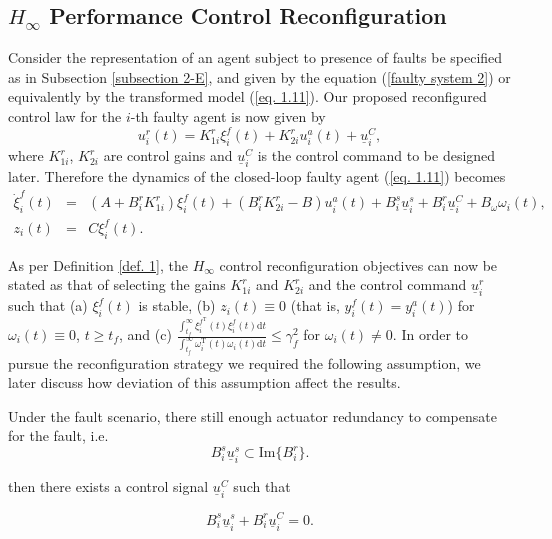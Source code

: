 \documentclass[12pt,draftcls,onecolumn]{IEEEtran}
\begin{document}
\subsection{$H_{\infty}$ Performance Control Reconfiguration}\label{subsection 1}
Consider the representation of an agent subject to presence of faults be  specified as in Subsection \ref{subsection 2-E}, and given by the equation (\ref{faulty system 2}) or equivalently by the transformed model (\ref{eq. 1.11}). Our proposed reconfigured control law for the $i$-th faulty agent is now given by
\begin{equation}
u_i^r(t)=K_{1i}^{r}\xi_i^f(t)+K_{2i}^{r}u_i^a(t)+\underline u_i^C,\label{reconfigured control}
\end{equation}
{where  $K_{1i}^{r}$, $K_{2i}^{r}$ are control gains and $\underline u_i^C$ is the control command to be designed later}. Therefore the dynamics of the closed-loop faulty agent (\ref{eq. 1.11})  becomes 
\begin{eqnarray}
\dot \xi_i^f(t)&=&(A+B_i^rK_{1i}^{r})\xi_i^f(t)+(B_i^rK_{2i}^{r}-B)u_i^a(t)+B_i^s\underline u_i^s+B_i^r\underline u_i^C+B_{\omega}\omega_i(t),\label{faulty agent tracking}\\
z_i(t)&=&C\xi_i^f(t).\nonumber
\end{eqnarray}\par
 As per Definition \ref{def. 1}, the $H_\infty$ control reconfiguration objectives can now be stated as that of selecting the gains $K_{1i}^{r}$ and $K_{2i}^{r}$ and the control command $\underline  u_i^r$ such that (a) $\xi_i^f(t)$ is stable, (b) $z_i(t)\equiv0$ (that is, $y_i^f(t)=y_i^a(t)$) for $\omega_i(t)\equiv0$, $t\geq t_f$, and  (c)  $\frac{\int_{t_f}^{\infty}\xi_i^{f^\text{T}}(t)\xi_i^f(t)\text{d}t}{\int_{t_f}^{\infty}\omega_i^{\text{T}}(t)\omega_i(t)\text{d}t}\leq \gamma_f^2$ for $\omega_i(t)\ne 0$.  In order to pursue the reconfiguration strategy we required the following assumption, we later discuss how deviation of this assumption affect the results.
{ \begin{assumptions}\label{stuck condition1}
 Under the fault scenario, there still enough actuator redundancy to compensate for the fault, i.e.
\begin{equation}
B_i^s\underline u_i^s\subset \text{Im}\{B_i^r\}.\label{stuck condition}
\end{equation}
\end{assumptions}
 then there exists a control signal  $\underline u_i^C$ such that }
 \begin{equation}
 B_i^s\underline u_i^s+B_i^r\underline u_i^C=0.\label{stuck term solution}
 \end{equation} 
\end{document}
